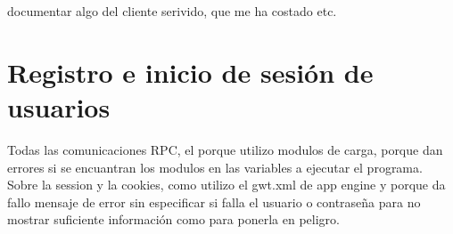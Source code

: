  
 documentar algo del cliente serivido, que me ha costado etc.



\section{Registro e inicio de sesión de usuarios}
Todas las comunicaciones RPC, el porque utilizo modulos de carga, porque dan errores si se encuantran los modulos en las variables a ejecutar el programa.
Sobre la session y la cookies, como utilizo el gwt.xml de app engine y porque da fallo
mensaje de error sin especificar si falla el usuario o contraseña para no mostrar suficiente información como para ponerla en peligro.
